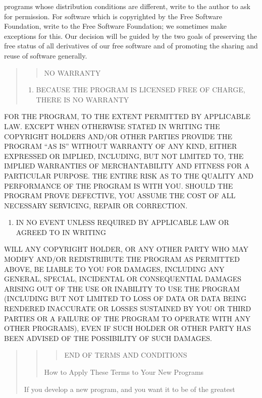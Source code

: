 \documentclass[letterpaper,10pt,english]{sphinxmanual}
\begin{document}
programs whose distribution conditions are different, write to the author
to ask for permission.  For software which is copyrighted by the Free
Software Foundation, write to the Free Software Foundation; we sometimes
make exceptions for this.  Our decision will be guided by the two goals
of preserving the free status of all derivatives of our free software and
of promoting the sharing and reuse of software generally.
\begin{quote}
\begin{quote}

NO WARRANTY
\end{quote}
\begin{enumerate}
%
\setcounter{enumi}{10}
\item {} 
BECAUSE THE PROGRAM IS LICENSED FREE OF CHARGE, THERE IS NO WARRANTY

\end{enumerate}
\end{quote}

FOR THE PROGRAM, TO THE EXTENT PERMITTED BY APPLICABLE LAW.  EXCEPT WHEN
OTHERWISE STATED IN WRITING THE COPYRIGHT HOLDERS AND/OR OTHER PARTIES
PROVIDE THE PROGRAM “AS IS” WITHOUT WARRANTY OF ANY KIND, EITHER EXPRESSED
OR IMPLIED, INCLUDING, BUT NOT LIMITED TO, THE IMPLIED WARRANTIES OF
MERCHANTABILITY AND FITNESS FOR A PARTICULAR PURPOSE.  THE ENTIRE RISK AS
TO THE QUALITY AND PERFORMANCE OF THE PROGRAM IS WITH YOU.  SHOULD THE
PROGRAM PROVE DEFECTIVE, YOU ASSUME THE COST OF ALL NECESSARY SERVICING,
REPAIR OR CORRECTION.
\begin{enumerate}
%
\setcounter{enumi}{11}
\item {} 
IN NO EVENT UNLESS REQUIRED BY APPLICABLE LAW OR AGREED TO IN WRITING

\end{enumerate}

WILL ANY COPYRIGHT HOLDER, OR ANY OTHER PARTY WHO MAY MODIFY AND/OR
REDISTRIBUTE THE PROGRAM AS PERMITTED ABOVE, BE LIABLE TO YOU FOR DAMAGES,
INCLUDING ANY GENERAL, SPECIAL, INCIDENTAL OR CONSEQUENTIAL DAMAGES ARISING
OUT OF THE USE OR INABILITY TO USE THE PROGRAM (INCLUDING BUT NOT LIMITED
TO LOSS OF DATA OR DATA BEING RENDERED INACCURATE OR LOSSES SUSTAINED BY
YOU OR THIRD PARTIES OR A FAILURE OF THE PROGRAM TO OPERATE WITH ANY OTHER
PROGRAMS), EVEN IF SUCH HOLDER OR OTHER PARTY HAS BEEN ADVISED OF THE
POSSIBILITY OF SUCH DAMAGES.
\begin{quote}
\begin{quote}
\begin{quote}

END OF TERMS AND CONDITIONS
\end{quote}

How to Apply These Terms to Your New Programs
\end{quote}

If you develop a new program, and you want it to be of the greatest
\end{quote}
\end{document}
